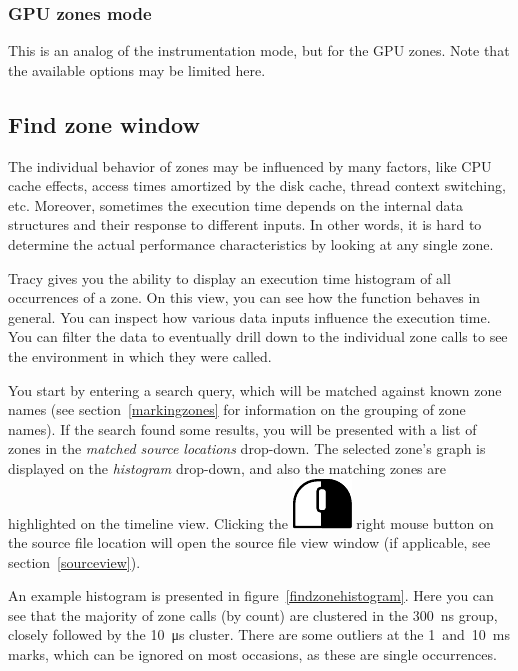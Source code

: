 \documentclass[hidelinks,titlepage,a4paper]{article}
\newcommand{\RMB}{\includegraphics[height=.8\baselineskip]{icons/rmb}}
\begin{document}
\subsubsection{GPU zones mode}

This is an analog of the instrumentation mode, but for the GPU zones. Note that the available options may be limited here.

\subsection{Find zone window}
\label{findzone}

The individual behavior of zones may be influenced by many factors, like CPU cache effects, access times amortized by the disk cache, thread context switching, etc. Moreover, sometimes the execution time depends on the internal data structures and their response to different inputs. In other words, it is hard to determine the actual performance characteristics by looking at any single zone.

Tracy gives you the ability to display an execution time histogram of all occurrences of a zone. On this view, you can see how the function behaves in general. You can inspect how various data inputs influence the execution time. You can filter the data to eventually drill down to the individual zone calls to see the environment in which they were called.

You start by entering a search query, which will be matched against known zone names (see section~\ref{markingzones} for information on the grouping of zone names). If the search found some results, you will be presented with a list of zones in the \emph{matched source locations} drop-down. The selected zone's graph is displayed on the \emph{histogram} drop-down, and also the matching zones are highlighted on the timeline view. Clicking the \RMB{} right mouse button on the source file location will open the source file view window (if applicable, see section~\ref{sourceview}).

An example histogram is presented in figure~\ref{findzonehistogram}. Here you can see that the majority of zone calls (by count) are clustered in the 300~\si{\nano\second} group, closely followed by the 10~\si{\micro\second} cluster. There are some outliers at the 1~and~10~\si{\milli\second} marks, which can be ignored on most occasions, as these are single occurrences.
\end{document}
